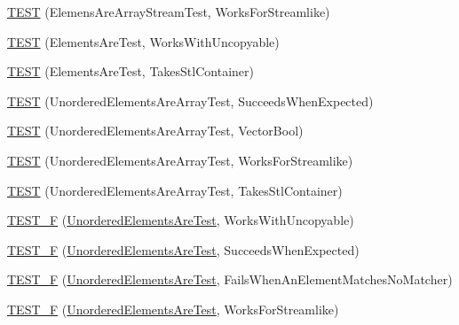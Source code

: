 \begin{DoxyCompactItemize}
\hyperlink{namespacetesting_1_1gmock__matchers__test_a5cc317a80c3501cb7f53d07043b7270c}{T\+E\+ST} (Elemens\+Are\+Array\+Stream\+Test, Works\+For\+Streamlike)
\item 
\hyperlink{namespacetesting_1_1gmock__matchers__test_ab403dce87c2d198a4f709d7f781d03c6}{T\+E\+ST} (Elements\+Are\+Test, Works\+With\+Uncopyable)
\item 
\hyperlink{namespacetesting_1_1gmock__matchers__test_a290280b9e89a57833c9fc706d153b98a}{T\+E\+ST} (Elements\+Are\+Test, Takes\+Stl\+Container)
\item 
\hyperlink{namespacetesting_1_1gmock__matchers__test_adb7e47654f1536fc049243f765292825}{T\+E\+ST} (Unordered\+Elements\+Are\+Array\+Test, Succeeds\+When\+Expected)
\item 
\hyperlink{namespacetesting_1_1gmock__matchers__test_a3d7df4fa0dd3e8247f4c2d4b02d801f0}{T\+E\+ST} (Unordered\+Elements\+Are\+Array\+Test, Vector\+Bool)
\item 
\hyperlink{namespacetesting_1_1gmock__matchers__test_a1ff2a93a8f031a5b23dbc699a462043b}{T\+E\+ST} (Unordered\+Elements\+Are\+Array\+Test, Works\+For\+Streamlike)
\item 
\hyperlink{namespacetesting_1_1gmock__matchers__test_aa3a960ec78e2b1e860c305f4598f39ec}{T\+E\+ST} (Unordered\+Elements\+Are\+Array\+Test, Takes\+Stl\+Container)
\item 
\hyperlink{namespacetesting_1_1gmock__matchers__test_ab09132c3b991b8f104f3091370d2fe55}{T\+E\+S\+T\+\_\+F} (\hyperlink{classtesting_1_1gmock__matchers__test_1_1_unordered_elements_are_test}{Unordered\+Elements\+Are\+Test}, Works\+With\+Uncopyable)
\item 
\hyperlink{namespacetesting_1_1gmock__matchers__test_a177c3db59da001df2441deb1ddb083af}{T\+E\+S\+T\+\_\+F} (\hyperlink{classtesting_1_1gmock__matchers__test_1_1_unordered_elements_are_test}{Unordered\+Elements\+Are\+Test}, Succeeds\+When\+Expected)
\item 
\hyperlink{namespacetesting_1_1gmock__matchers__test_a62fd481b1160a667c785e6009ff87163}{T\+E\+S\+T\+\_\+F} (\hyperlink{classtesting_1_1gmock__matchers__test_1_1_unordered_elements_are_test}{Unordered\+Elements\+Are\+Test}, Fails\+When\+An\+Element\+Matches\+No\+Matcher)
\item 
\hyperlink{namespacetesting_1_1gmock__matchers__test_a2affca2a152e4537c2f06518eaa2eac5}{T\+E\+S\+T\+\_\+F} (\hyperlink{classtesting_1_1gmock__matchers__test_1_1_unordered_elements_are_test}{Unordered\+Elements\+Are\+Test}, Works\+For\+Streamlike)
\item 

\end{DoxyCompactItemize}
